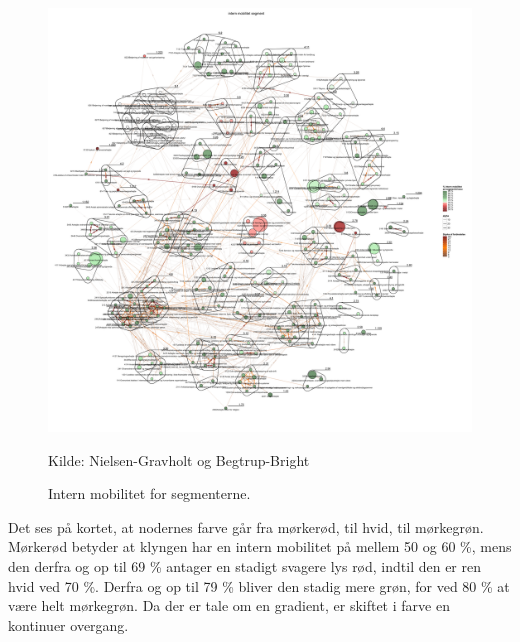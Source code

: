 \begin{figure}[H]
\begin{center}
	\caption{Intern mobilitet for segmenterne.}
	\label{fig_analyse_deskriptivt_kort_intern_mob_seg}
	\includegraphics[width=1.0\textwidth]{fig/netvaerkskort/kort_intern_mob_seg.pdf}
	\centerline{ \tiny{Kilde: Nielsen-Gravholt og Begtrup-Bright}}
\end{center}
\end{figure}
\restoregeometry

Det ses på kortet, at nodernes farve går fra mørkerød, til hvid, til mørkegrøn. Mørkerød betyder at klyngen har en intern mobilitet på mellem 50 og 60 \%, mens den derfra og op til 69 \% antager en stadigt svagere lys rød, indtil den er ren hvid ved 70 \%. Derfra og op til 79 \% bliver den stadig mere grøn, for ved 80 \% at være helt mørkegrøn. Da der er tale om en gradient, er skiftet i farve en kontinuer overgang. 

